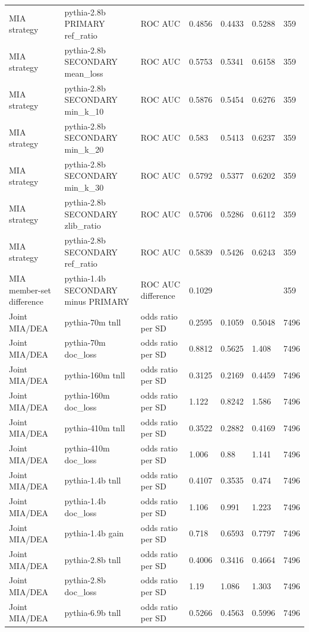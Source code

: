 \begin{tabular}{lllllll}
MIA strategy & pythia-2.8b PRIMARY ref\_ratio & ROC AUC & 0.4856 & 0.4433 & 0.5288 & 359 \\
MIA strategy & pythia-2.8b SECONDARY mean\_loss & ROC AUC & 0.5753 & 0.5341 & 0.6158 & 359 \\
MIA strategy & pythia-2.8b SECONDARY min\_k\_10 & ROC AUC & 0.5876 & 0.5454 & 0.6276 & 359 \\
MIA strategy & pythia-2.8b SECONDARY min\_k\_20 & ROC AUC & 0.583 & 0.5413 & 0.6237 & 359 \\
MIA strategy & pythia-2.8b SECONDARY min\_k\_30 & ROC AUC & 0.5792 & 0.5377 & 0.6202 & 359 \\
MIA strategy & pythia-2.8b SECONDARY zlib\_ratio & ROC AUC & 0.5706 & 0.5286 & 0.6112 & 359 \\
MIA strategy & pythia-2.8b SECONDARY ref\_ratio & ROC AUC & 0.5839 & 0.5426 & 0.6243 & 359 \\
MIA member-set difference & pythia-1.4b SECONDARY minus PRIMARY & ROC AUC difference & 0.1029 &  &  & 359 \\
Joint MIA/DEA & pythia-70m tnll & odds ratio per SD & 0.2595 & 0.1059 & 0.5048 & 7496 \\
Joint MIA/DEA & pythia-70m doc\_loss & odds ratio per SD & 0.8812 & 0.5625 & 1.408 & 7496 \\
Joint MIA/DEA & pythia-160m tnll & odds ratio per SD & 0.3125 & 0.2169 & 0.4459 & 7496 \\
Joint MIA/DEA & pythia-160m doc\_loss & odds ratio per SD & 1.122 & 0.8242 & 1.586 & 7496 \\
Joint MIA/DEA & pythia-410m tnll & odds ratio per SD & 0.3522 & 0.2882 & 0.4169 & 7496 \\
Joint MIA/DEA & pythia-410m doc\_loss & odds ratio per SD & 1.006 & 0.88 & 1.141 & 7496 \\
Joint MIA/DEA & pythia-1.4b tnll & odds ratio per SD & 0.4107 & 0.3535 & 0.474 & 7496 \\
Joint MIA/DEA & pythia-1.4b doc\_loss & odds ratio per SD & 1.106 & 0.991 & 1.223 & 7496 \\
Joint MIA/DEA & pythia-1.4b gain & odds ratio per SD & 0.718 & 0.6593 & 0.7797 & 7496 \\
Joint MIA/DEA & pythia-2.8b tnll & odds ratio per SD & 0.4006 & 0.3416 & 0.4664 & 7496 \\
Joint MIA/DEA & pythia-2.8b doc\_loss & odds ratio per SD & 1.19 & 1.086 & 1.303 & 7496 \\
Joint MIA/DEA & pythia-6.9b tnll & odds ratio per SD & 0.5266 & 0.4563 & 0.5996 & 7496 \\

\end{tabular}
